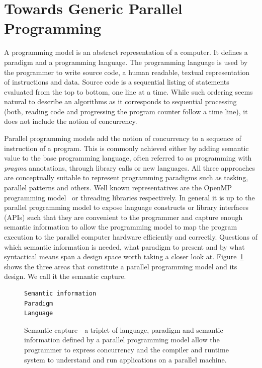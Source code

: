 \section{Towards Generic Parallel Programming}\label{chap:background}

A programming model is an abstract representation of a computer. It defines a paradigm and a programming language. The programming language is used by the programmer to write source code, a human readable, textual representation of instructions and data. Source code is a sequential listing of statements evaluated from the top to bottom, one line at a time. While such ordering seems natural to describe an algorithms as it corresponds to sequential processing (both, reading code and progressing the program counter follow a time line), it does not include the notion of concurrency. 

Parallel programming models add the notion of concurrency to a sequence of instruction of a program. This is commonly achieved either by adding semantic value to the base programming language, often referred to as programming with \emph{pragma} annotations, through library calls or new languages. All three approaches are conceptually suitable to represent programming paradigms such as tasking, parallel patterns and others. Well known representatives are the OpenMP programming model~\cite{CITEOPENMP} or threading libraries respectively. In general it is up to the parallel programming model to expose language constructs or library interfaces (APIs) such that they are convenient to the programmer and capture enough semantic information to allow the programming model to map the program execution to the parallel computer hardware efficiently and correctly. Questions of which semantic information is needed, what paradigm to present and by what syntactical means span a design space worth taking a closer look at. Figure~\ref{figSemCapture} shows the three areas that constitute a parallel programming model and its design. We call it the semantic capture.

\begin{figure}[h]
\begin{Verbatim}[frame=leftline]
Semantic information
Paradigm 
Language
\end{Verbatim}
\caption{Semantic capture - a triplet of language, paradigm and semantic information defined by a parallel programming model allow the programmer to express concurrency and the compiler and runtime system to understand and run applications on a parallel machine.}
\label{figSemCapture}
\end{figure}

